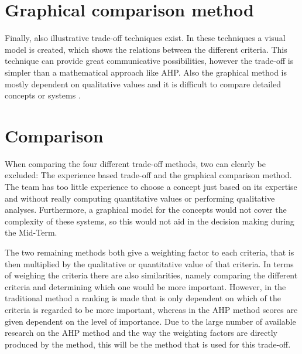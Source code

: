 \section{Graphical comparison method}
\label{graph}
Finally, also illustrative trade-off techniques exist. In these techniques a visual model is created, which shows the relations between the different criteria. This technique can provide great communicative possibilities, however the trade-off is simpler than a mathematical approach like AHP. Also the graphical method is mostly dependent on qualitative values and it is difficult to compare detailed concepts or systems \cite{tradeoff}.

\section{Comparison}
\label{comp}
When comparing the four different trade-off methods, two can clearly be excluded: The experience based trade-off and the graphical comparison method. The team has too little experience to choose a concept just based on its expertise and without really computing quantitative values or performing qualitative analyses. Furthermore, a graphical model for the concepts would not cover the complexity of these systems, so this would not aid in the decision making during the Mid-Term.

The two remaining methods both give a weighting factor to each criteria, that is then multiplied by the qualitative or quantitative value of that criteria. In terms of weighing the criteria there are also similarities, namely comparing the different criteria and determining which one would be more important. However, in the traditional method a ranking is made that is only dependent on which of the criteria is regarded to be more important, whereas in the AHP method scores are given dependent on the level of importance. Due to the large number of available research on the AHP method and the way the weighting factors are directly produced by the method, this will be the method that is used for this trade-off. 